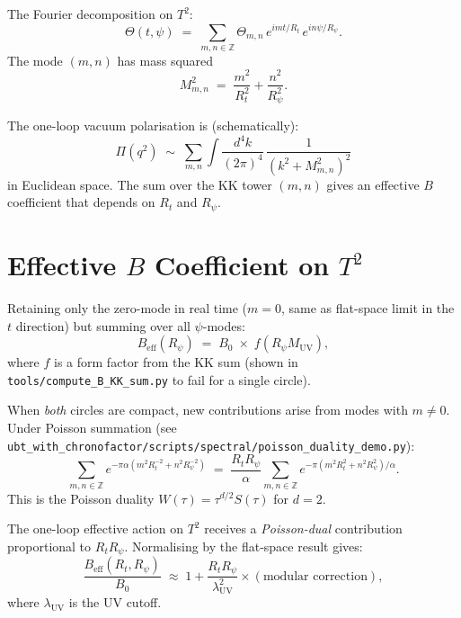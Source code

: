 \documentclass[12pt,a4paper]{article}
\theoremstyle{definition}
\theoremstyle{remark}
\begin{document}
The Fourier decomposition on $T^2$:
\begin{equation}
  \Theta(t,\psi)
  \;=\; \sum_{m,n\in\mathbb{Z}} \Theta_{m,n}\,
        e^{i m t / R_t}\,e^{i n \psi / R_\psi}.
\end{equation}
The mode $(m,n)$ has mass squared
\begin{equation}
  M_{m,n}^2 \;=\; \frac{m^2}{R_t^2} + \frac{n^2}{R_\psi^2}.
\end{equation}

The one-loop vacuum polarisation is (schematically):
\begin{equation}
  \Pi(q^2)
  \;\sim\; \sum_{m,n} \int \frac{d^4k}{(2\pi)^4}\,
           \frac{1}{(k^2 + M_{m,n}^2)^2}
\end{equation}
in Euclidean space.  The sum over the KK tower $(m,n)$ gives an effective
$B$ coefficient that depends on $R_t$ and $R_\psi$.

\section{Effective $B$ Coefficient on $T^2$}
\label{sec:effective_B}

Retaining only the zero-mode in real time ($m = 0$, same as flat-space
limit in the $t$ direction) but summing over all $\psi$-modes:
\begin{equation}
  B_{\mathrm{eff}}(R_\psi) \;=\; B_0 \;\times\; f(R_\psi M_{\mathrm{UV}}),
\end{equation}
where $f$ is a form factor from the KK sum (shown in
\texttt{tools/compute\_B\_KK\_sum.py} to fail for a single circle).

When \emph{both} circles are compact, new contributions arise from modes
with $m \neq 0$.  Under Poisson summation (see
\texttt{ubt\_with\_chronofactor/scripts/spectral/poisson\_duality\_demo.py}):
\begin{equation}
  \sum_{m,n\in\mathbb{Z}} e^{-\pi\alpha(m^2 R_t^{-2} + n^2 R_\psi^{-2})}
  \;=\; \frac{R_t R_\psi}{\alpha}
    \sum_{m,n\in\mathbb{Z}} e^{-\pi(m^2 R_t^2 + n^2 R_\psi^2)/\alpha}.
\end{equation}
This is the Poisson duality $W(\tau) = \tau^{d/2} S(\tau)$ for $d=2$.

The one-loop effective action on $T^2$ receives a \emph{Poisson-dual}
contribution proportional to $R_t R_\psi$.  Normalising by the flat-space
result gives:
\begin{equation}
  \frac{B_{\mathrm{eff}}(R_t, R_\psi)}{B_0}
  \;\approx\; 1 + \frac{R_t R_\psi}{\lambda_{\mathrm{UV}}^2}
              \times (\text{modular correction}),
\end{equation}
where $\lambda_{\mathrm{UV}}$ is the UV cutoff.
\end{document}
